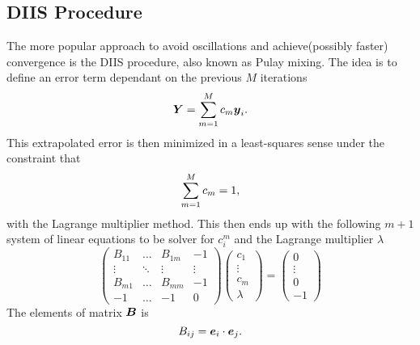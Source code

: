 \subsection{DIIS Procedure}
    The more popular approach to avoid oscillations and achieve(possibly
    faster) convergence is the DIIS procedure, also known as Pulay
    mixing\cite{PULAY,PULAY2}. The idea is to define an 
    error term dependant on the previous $M$ iterations
        \begin{equation}
            \blds{Y} = \suml{m=1}{M} c_m\blds{y}_i.
            \label{eq:errorDIISdef}
        \end{equation}
    This extrapolated error is then minimized in a least-squares sense under
    the constraint that
        \begin{equation}
            \suml{m=1}{M} c_m = 1,
        \end{equation}
    with the Lagrange multiplier method. This then ends up with the following
    $m+1$ system of linear equations to be solver for ${c}^{m}_i$ and the
    Lagrange multiplier $\lambda$
        \begin{equation}
            \begin{pmatrix}
                B_{11} & \dots & B_{1m} & -1 \\
                \vdots & \ddots & \vdots & \vdots \\
                B_{m1} & \dots & B_{mm} & -1 \\
                -1 & \dots & -1 & 0
            \end{pmatrix}
            \begin{pmatrix}
                c_1 \\
                \vdots \\
                c_m \\
                \lambda
            \end{pmatrix}
            =
            \begin{pmatrix}
                0 \\
                \vdots \\
                0 \\
                -1
            \end{pmatrix}
        \end{equation}
    The elements of matrix $\blds{B}$ is
        \begin{equation}
            B_{ij} = \blds{e}_i \cdot \blds{e}_j.
        \end{equation}
